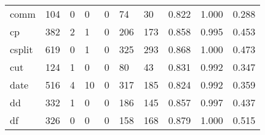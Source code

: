 \begin{longtable}{lp{2.0cm}p{2.0cm}p{2.0cm}p{2.0cm}p{2.0cm}p{2.0cm}p{2.0cm}p{2.0cm}p{2.0cm}}
comm      &                    104 &                                             0 &                                            0 &                                           0 &                                           74 &                                         30 &                                0.822 &                                  1.000 &                                0.288 \\
cp        &                    382 &                                             2 &                                            1 &                                           0 &                                          206 &                                        173 &                                0.858 &                                  0.995 &                                0.453 \\
csplit    &                    619 &                                             0 &                                            1 &                                           0 &                                          325 &                                        293 &                                0.868 &                                  1.000 &                                0.473 \\
cut       &                    124 &                                             1 &                                            0 &                                           0 &                                           80 &                                         43 &                                0.831 &                                  0.992 &                                0.347 \\
date      &                    516 &                                             4 &                                           10 &                                           0 &                                          317 &                                        185 &                                0.824 &                                  0.992 &                                0.359 \\
dd        &                    332 &                                             1 &                                            0 &                                           0 &                                          186 &                                        145 &                                0.857 &                                  0.997 &                                0.437 \\
df        &                    326 &                                             0 &                                            0 &                                           0 &                                          158 &                                        168 &                                0.879 &                                  1.000 &                                0.515 \\

\end{longtable}

